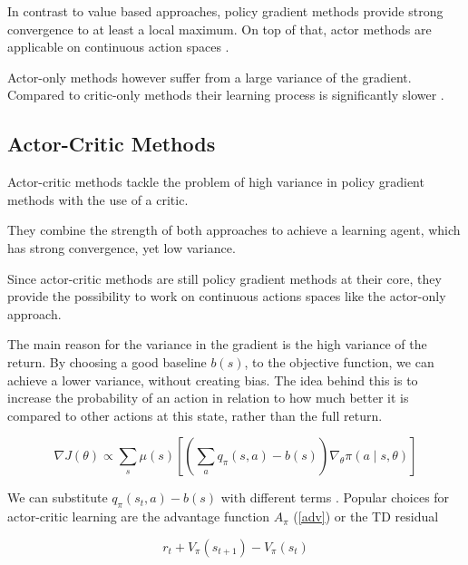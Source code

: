 In contrast to value based approaches, policy gradient methods provide strong convergence to at least a local maximum.
On top of that, actor methods are applicable on continuous action spaces
 \citep{Sutton00policygradient}.
 
Actor-only methods however suffer from a large variance of the gradient. Compared to critic-only methods their learning process is significantly slower \citep{Grondman12}.
 

\subsection{Actor-Critic Methods}

Actor-critic methods tackle the problem of high variance in policy gradient methods with the use of a critic.

They combine the strength of both approaches to achieve a learning agent, which has strong convergence, yet low variance.

Since actor-critic methods are still policy gradient methods at their core, they provide the possibility to work on continuous actions spaces like the actor-only approach.

The main reason for the variance in the gradient is the high variance of the return. By choosing a good baseline $ b(s)$, to the objective function, we can achieve a lower variance, without creating bias.
The idea behind this is to increase the probability of an action in relation to how much better it is compared to other actions at this state, rather than the full return.

\begin{equation}
\nabla J(\theta) \propto \sum_s \mu(s) \left[ \left( \sum_a q_\pi (s,a) -b(s)\right) \nabla_\theta \pi (a \mid s, \theta) \right]
\end{equation}

We can substitute $q_\pi(s_t,a) -b(s)$ with different terms \citep{Schulman15}.
Popular choices for actor-critic learning are the advantage function $A_\pi$ (\ref{adv}) or the TD residual 

\begin{equation}
r_t + V_\pi(s_{t+1}) - V_\pi(s_t)
\end{equation} 



